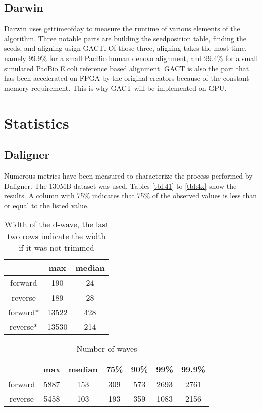 \documentclass[../main/thesis.tex]{subfiles}
\begin{document}
\subsection{Darwin}
Darwin uses gettimeofday \cite{gettimeofday} to measure the runtime of various elements of the algorithm.
Three notable parts are building the seedposition table, finding the seeds, and aligning usign GACT.
Of those three, aligning takes the most time, namely 99.9\% for a small PacBio human denovo alignment, and 99.4\% for a small simulated PacBio E.coli reference based alignment.
GACT is also the part that has been accelerated on FPGA by the original creators because of the constant memory requirement.
This is why GACT will be implemented on GPU.

\section{Statistics}
\subsection{Daligner}
Numerous metrics have been measured to characterize the process performed by Daligner.
The 130MB dataset was used.
Tables \ref{tbl:41} to \ref{tbl:4x} show the results.
A column with 75\% indicates that 75\% of the observed values is less than or equal to the listed value.

\begin{table}[h]
\caption{Width of the d-wave, the last two rows indicate the width if it was not trimmed}
\centering
\vspace{-5pt}
\begin{tabular}{c|c c}
& max & median \\ \hline
forward & 190 & 24 \\
reverse & 189 & 28 \\ \hline
forward* & 13522 & 428 \\
reverse* & 13530 & 214 \\
\end{tabular}
\end{table}

\begin{table}[h]
\caption{Number of waves}
\centering
\vspace{-5pt}
\begin{tabular}{c|c c c c c c}
& max & median & 75\% & 90\% & 99\% & 99.9\% \\ \hline
forward & 5887 & 153 & 309 & 573 & 2693 & 2761 \\
reverse & 5458 & 103 & 193 & 359 & 1083 & 2156 \\
\end{tabular}
\end{table}
\end{document}
